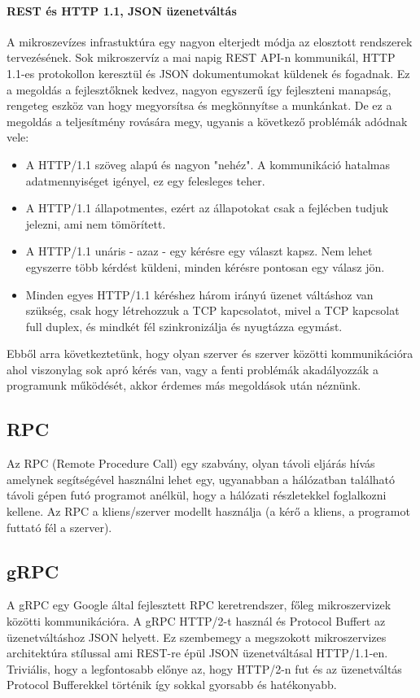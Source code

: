 \paragraph{REST és HTTP 1.1, JSON üzenetváltás}
A mikroszevízes infrastuktúra egy nagyon elterjedt módja az elosztott rendszerek tervezésének.
Sok mikroszervíz a mai napig REST API-n kommunikál, HTTP 1.1-es protokollon keresztül és JSON dokumentumokat küldenek és fogadnak.
Ez a megoldás a fejlesztőknek kedvez, nagyon egyszerű így fejleszteni manapság, rengeteg eszköz van hogy megyorsítsa és megkönnyítse a munkánkat.
De ez a megoldás a teljesítmény rovására megy, ugyanis a következő problémák adódnak vele:
\begin{itemize}
    \item A HTTP/1.1  szöveg alapú és nagyon "nehéz". A kommunikáció hatalmas adatmennyiséget igényel, ez egy felesleges teher.
    \item A HTTP/1.1  állapotmentes, ezért az állapotokat csak a fejlécben tudjuk jelezni, ami nem tömörített.
    \item A HTTP/1.1  unáris - azaz - egy kérésre egy választ kapsz. Nem lehet egyszerre több kérdést küldeni, minden kérésre pontosan egy válasz jön.
    \item Minden egyes HTTP/1.1 kéréshez három irányú üzenet váltáshoz van szükség, csak hogy létrehozzuk a TCP kapcsolatot, mivel a TCP kapcsolat full duplex, és mindkét fél szinkronizálja és nyugtázza egymást.
\end{itemize}
Ebből arra következtetünk, hogy olyan szerver és szerver közötti kommunikációra ahol viszonylag sok apró kérés van, vagy a fenti problémák
akadályozzák a programunk működését, akkor érdemes más megoldások után néznünk.

\subsection{RPC}
Az RPC \cite{RPC} (Remote Procedure Call) egy szabvány, olyan távoli eljárás hívás amelynek segítségével használni lehet egy, ugyanabban a hálózatban található távoli gépen futó programot anélkül, hogy a hálózati részletekkel foglalkozni kellene.
Az RPC a kliens/szerver modellt használja (a kérő a kliens, a programot futtató fél a szerver).

\subsection{gRPC}
A gRPC \cite{gRPC} egy Google által fejlesztett RPC keretrendszer, főleg mikroszervizek közötti kommunikációra.
A gRPC HTTP/2-t használ és Protocol Buffert az üzenetváltáshoz JSON helyett. Ez szembemegy a megszokott mikroszervizes architektúra stílussal ami REST-re épül JSON üzenetváltásal HTTP/1.1-en.
Triviális, hogy a legfontosabb előnye az, hogy HTTP/2-n fut és az üzenetváltás Protocol Bufferekkel történik így sokkal gyorsabb és hatékonyabb.


